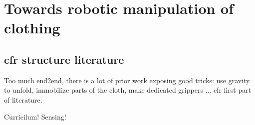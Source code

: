 \documentclass[\home/main.tex]{subfiles}
\begin{document}
\chapter{Towards robotic manipulation of clothing }\label{ch:towards_robotic_folding}
\section{cfr structure literature}

Too much end2end, there is a lot of prior work exposing good tricks: use gravity to unfold, immobilize parts of the cloth, make dedicated grippers ... cfr first part of literature. 

Curricilum!
Sensing!
\end{document}
